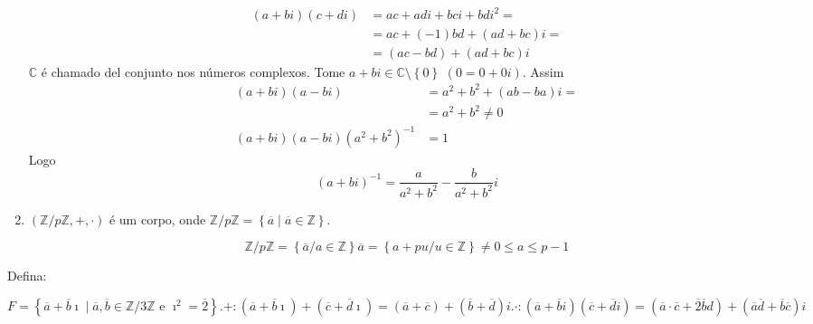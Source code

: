 \begin{example}
\begin{enumerate}
		      \begin{align*}
			      \left(a+bi\right)\left(c+di\right)
			       & =ac+adi+bci+bdi^{2}=                       \\
			       & =ac+\left(-1\right)bd+\left(ad+bc\right)i= \\
			       & =\left(ac-bd\right)+\left(ad+bc\right)i
		      \end{align*}
		      $\mathbb{C}$ é chamado del conjunto nos números complexos.
		      Tome $a+bi\in\mathbb{C}\setminus\left\{0\right\}$
		      $(0=0+0i)$.
		      Assim
		      \begin{align*}
			      \left(a+bi\right)\left(a-bi\right)
			       & =a^{2}+b^{2}+\left(ab-ba\right)i= \\
			       & =a^{2}+b^{2} \neq 0               \\
			      \left(a+bi\right)\left(a-bi\right)
			      \left(a^{2}+b^{2}\right)^{-1}
			       & =1
		      \end{align*}
		      Logo
		      $$
			      \left(a+bi\right)^{-1}=
			      \frac{a}{a^{2}+b^{2}}-
			      \frac{b}{a^{2}+b^{2}}i
		      $$

		\item

		      $\left(\mathbb{Z}/p\mathbb{Z},+,\cdot\right)$ é um corpo, onde $\mathbb{Z}/p\mathbb{Z}=\left\{\overline{a}\mid \overline{a}\in\mathbb{Z}\right\}$.

		      \[
			      \mathbb{Z}/p\mathbb{Z}=
			      \left\{\overline{a}/a\in\mathbb{Z}\right\}
			      \overline{a}=
			      \left\{a+pu/u\in\mathbb{Z}\right\}
			      \neq0\leq a\leq p-1
		      \]

	\end{enumerate}
\end{example}

Defina:

$$
	F=
	\left\{
	\overline{a}+\overline{b}\imath\mid
	\overline{a},\overline{b}\in\mathbb{Z}/3\mathbb{Z}
	\text{ e }\imath^{2}=\overline{2}
	\right\}.
	+\colon
	\left(\overline{a}+\overline{b}\imath\right)+
	\left(\overline{c}+\overline{d}\imath\right)=
	\left(\overline{a}+\overline{c}\right)+
	\left(\overline{b}+\overline{d}\right)i.
	\cdot\colon
	\left(\overline{a}+\overline{b}i\right)
	\left(\overline{c}+\overline{d}i\right)=
	\left(\overline{a}\cdot\overline{c}+\overline{2}\overline{b}d\right)+
	\left(\overline{a}\overline{d}+\overline{b}\overline{c}\right)i
$$

